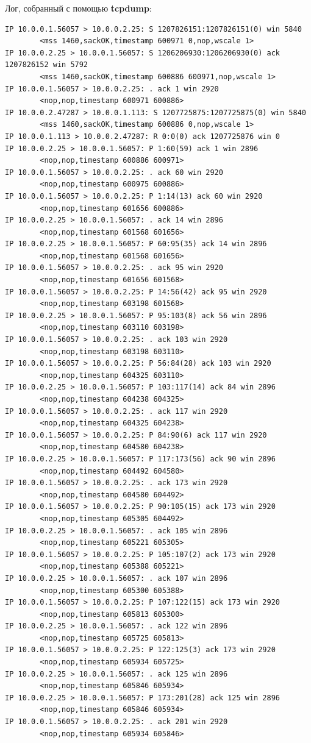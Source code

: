 \documentclass[a4paper,12pt]{article}
\begin{document}
Лог, собранный с помощью \textbf{tcpdump}:
\begin{verbatim}
IP 10.0.0.1.56057 > 10.0.0.2.25: S 1207826151:1207826151(0) win 5840 
		<mss 1460,sackOK,timestamp 600971 0,nop,wscale 1>
IP 10.0.0.2.25 > 10.0.0.1.56057: S 1206206930:1206206930(0) ack 1207826152 win 5792 
		<mss 1460,sackOK,timestamp 600886 600971,nop,wscale 1>
IP 10.0.0.1.56057 > 10.0.0.2.25: . ack 1 win 2920 
		<nop,nop,timestamp 600971 600886>
IP 10.0.0.2.47287 > 10.0.0.1.113: S 1207725875:1207725875(0) win 5840 
		<mss 1460,sackOK,timestamp 600886 0,nop,wscale 1>
IP 10.0.0.1.113 > 10.0.0.2.47287: R 0:0(0) ack 1207725876 win 0
IP 10.0.0.2.25 > 10.0.0.1.56057: P 1:60(59) ack 1 win 2896 
		<nop,nop,timestamp 600886 600971>
IP 10.0.0.1.56057 > 10.0.0.2.25: . ack 60 win 2920 
		<nop,nop,timestamp 600975 600886>
IP 10.0.0.1.56057 > 10.0.0.2.25: P 1:14(13) ack 60 win 2920 
		<nop,nop,timestamp 601656 600886>
IP 10.0.0.2.25 > 10.0.0.1.56057: . ack 14 win 2896 
		<nop,nop,timestamp 601568 601656>
IP 10.0.0.2.25 > 10.0.0.1.56057: P 60:95(35) ack 14 win 2896 
		<nop,nop,timestamp 601568 601656>
IP 10.0.0.1.56057 > 10.0.0.2.25: . ack 95 win 2920 
		<nop,nop,timestamp 601656 601568>
IP 10.0.0.1.56057 > 10.0.0.2.25: P 14:56(42) ack 95 win 2920 
		<nop,nop,timestamp 603198 601568>
IP 10.0.0.2.25 > 10.0.0.1.56057: P 95:103(8) ack 56 win 2896 
		<nop,nop,timestamp 603110 603198>
IP 10.0.0.1.56057 > 10.0.0.2.25: . ack 103 win 2920 
		<nop,nop,timestamp 603198 603110>
IP 10.0.0.1.56057 > 10.0.0.2.25: P 56:84(28) ack 103 win 2920 
		<nop,nop,timestamp 604325 603110>
IP 10.0.0.2.25 > 10.0.0.1.56057: P 103:117(14) ack 84 win 2896 
		<nop,nop,timestamp 604238 604325>
IP 10.0.0.1.56057 > 10.0.0.2.25: . ack 117 win 2920 
		<nop,nop,timestamp 604325 604238>
IP 10.0.0.1.56057 > 10.0.0.2.25: P 84:90(6) ack 117 win 2920 
		<nop,nop,timestamp 604580 604238>
IP 10.0.0.2.25 > 10.0.0.1.56057: P 117:173(56) ack 90 win 2896 
		<nop,nop,timestamp 604492 604580>
IP 10.0.0.1.56057 > 10.0.0.2.25: . ack 173 win 2920 
		<nop,nop,timestamp 604580 604492>
IP 10.0.0.1.56057 > 10.0.0.2.25: P 90:105(15) ack 173 win 2920 
		<nop,nop,timestamp 605305 604492>
IP 10.0.0.2.25 > 10.0.0.1.56057: . ack 105 win 2896 
		<nop,nop,timestamp 605221 605305>
IP 10.0.0.1.56057 > 10.0.0.2.25: P 105:107(2) ack 173 win 2920 
		<nop,nop,timestamp 605388 605221>
IP 10.0.0.2.25 > 10.0.0.1.56057: . ack 107 win 2896 
		<nop,nop,timestamp 605300 605388>
IP 10.0.0.1.56057 > 10.0.0.2.25: P 107:122(15) ack 173 win 2920 
		<nop,nop,timestamp 605813 605300>
IP 10.0.0.2.25 > 10.0.0.1.56057: . ack 122 win 2896 
		<nop,nop,timestamp 605725 605813>
IP 10.0.0.1.56057 > 10.0.0.2.25: P 122:125(3) ack 173 win 2920 
		<nop,nop,timestamp 605934 605725>
IP 10.0.0.2.25 > 10.0.0.1.56057: . ack 125 win 2896 
		<nop,nop,timestamp 605846 605934>
IP 10.0.0.2.25 > 10.0.0.1.56057: P 173:201(28) ack 125 win 2896 
		<nop,nop,timestamp 605846 605934>
IP 10.0.0.1.56057 > 10.0.0.2.25: . ack 201 win 2920 
		<nop,nop,timestamp 605934 605846>
\end{verbatim}
\end{document}
